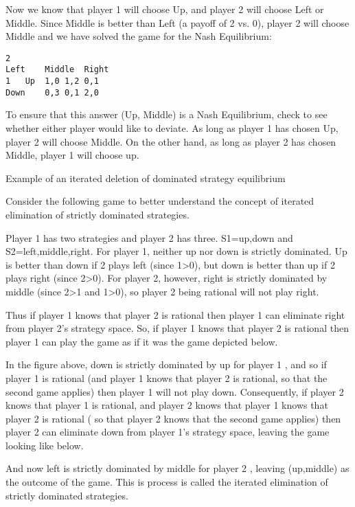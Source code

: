 \documentclass[11pt]{article} %
\begin{document}
Now we know that player 1 will choose Up, and player 2 will choose Left or Middle. Since Middle is better than Left (a payoff of 2 vs. 0), player 2 will choose Middle and we have solved the game for the Nash Equilibrium:

\begin{verbatim}
2
Left	Middle	Right
1	Up	1,0	1,2	0,1
Down	0,3	0,1	2,0
\end{verbatim}


To ensure that this answer (Up, Middle) is a Nash Equilibrium, 
check to see whether either player would like to deviate. 
As long as player 1 has chosen Up, player 2 will choose Middle. 
On the other hand, as long as player 2 has chosen Middle, player 1 will choose up.


\newpage

Example of an iterated deletion of dominated strategy equilibrium

Consider the following game to better understand the concept of 
iterated elimination of strictly dominated strategies.


Player 1 has two strategies and player 2 has three. S1={up,down} and S2={left,middle,right}. For player 1, neither up nor down is strictly dominated. Up is better than down if 2 plays left (since 1>0), but down is better than up if 2 plays right (since 2>0). For player 2, however, right is strictly dominated by middle (since 2>1 and 1>0), so player 2 being rational will not play right.

Thus if player 1 knows that player 2 is rational then player 1 can eliminate right from player 2's strategy space. So, if player 1 knows that player 2 is rational then player 1 can play the game as if it was the game depicted below.


In the figure above, down is strictly dominated by up for player 1 , and so if player 1 is rational (and player 1 knows that player 2 is rational, so that the second game applies) then player 1 will not play down. Consequently, if player 2 knows that player 1 is rational, and player 2 knows that player 1 knows that player 2 is rational ( so that player 2 knows that the second game applies) then player 2 can eliminate down from player 1's strategy space, leaving the game looking like below.


And now left is strictly dominated by middle for player 2 , leaving (up,middle) as 
the outcome of the game. 
This is process is called the iterated elimination of strictly dominated strategies.
\end{document}
